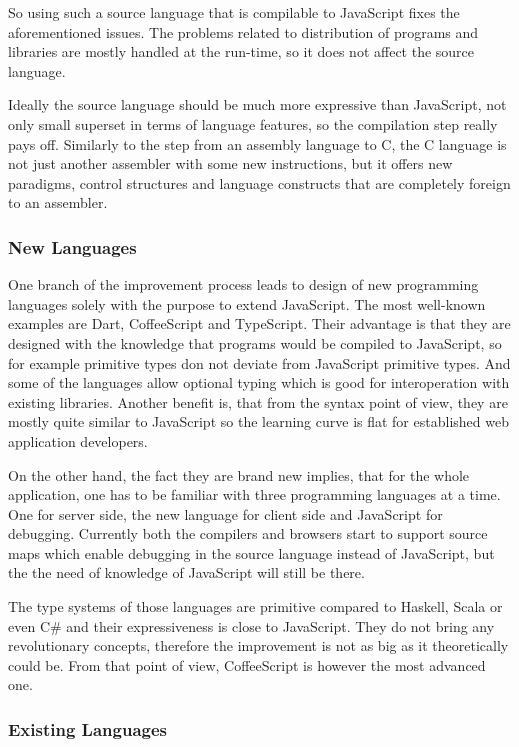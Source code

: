 \documentclass[12pt,a4paper]{report}
\begin{document}
So using such a source language that is compilable to JavaScript fixes the aforementioned issues. The problems related to distribution of programs and libraries are mostly handled at the run-time, so it does not affect the source language.

Ideally the source language should be much more expressive than JavaScript, not only small superset in terms of language features, so the compilation step really pays off. Similarly to the step from an assembly language to C, the C language is not just another assembler with some new instructions, but it offers new paradigms, control structures and language constructs that are completely foreign to an assembler.

\subsubsection*{New Languages} 

One branch of the improvement process leads to design of new programming languages solely with the purpose to extend JavaScript. The most well-known examples are Dart\cite{Dart}, CoffeeScript\cite{CoffeeScript} and TypeScript\cite{TypeScript}. Their advantage is that they are designed with the knowledge that programs would be compiled to JavaScript, so for example primitive types don not deviate from JavaScript primitive types. And some of the languages allow optional typing which is good for interoperation with existing libraries. Another benefit is, that from the syntax point of view, they are mostly quite similar to JavaScript so the learning curve is flat for established web application developers. 

On the other hand, the fact they are brand new implies, that for the whole application, one has to be familiar with three programming languages at a time. One for server side, the new language for client side and JavaScript for debugging. Currently both the compilers and browsers start to support source maps which enable debugging in the source language instead of JavaScript, but the the need of knowledge of JavaScript will still be there. 

The type systems of those languages are primitive compared to Haskell, Scala or even C\# and their expressiveness is close to JavaScript. They do not bring any revolutionary concepts, therefore the improvement is not as big as it theoretically could be. From that point of view, CoffeeScript is however the most advanced one.

\subsubsection*{Existing Languages} 
\end{document}

